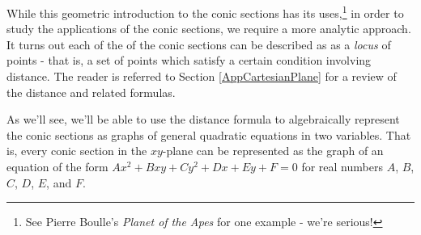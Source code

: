 \documentclass{ximera}
\begin{document}
\enlargethispage{.5in}
While this geometric introduction to the conic sections has its uses,\footnote{See Pierre Boulle's \textit{Planet of the Apes} for one example - we're serious!} in order to study the applications of the conic sections, we require a more analytic approach.  It turns out each of the  of the conic sections can be described as as a \textit{locus} of points - that is, a set of points which satisfy a certain condition involving distance.  The reader is referred to Section \ref{AppCartesianPlane} for a review of the distance and related formulas.

As we'll see, we'll be able to use the distance formula to algebraically represent the conic sections as  graphs of general quadratic equations in two variables.  That is, every conic section in the $xy$-plane can be represented as the graph of an equation of the form $Ax^2+Bxy+Cy^2+Dx+Ey +F = 0$ for real numbers $A$, $B$, $C$, $D$, $E$, and $F$.

\closegraphsfile
\end{document}
